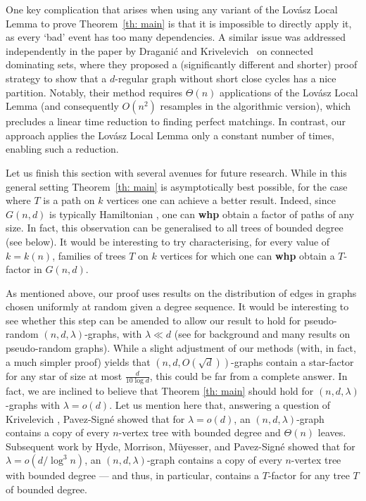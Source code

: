 \documentclass[notitlepage]{scrartcl}
\begin{document}
One key complication that arises when using any variant of the Lov\'asz Local Lemma to prove Theorem~\ref{th: main} is that it is impossible to directly apply it, as every `bad' event has too many dependencies. A similar issue was addressed independently in the paper by Dragani\'c and Krivelevich~\cite{DK} on connected dominating sets, where they proposed a (significantly different and shorter) proof strategy to show that a $d$-regular graph without short close cycles has a nice partition. Notably, their method requires $\Theta(n)$ applications of the Lov\'asz Local Lemma (and consequently $O(n^2)$ resamples in the algorithmic version), which precludes a linear time reduction to finding perfect matchings. In contrast, our approach applies the Lov\'asz Local Lemma only a constant number of times, enabling such a reduction.











Let us finish this section with several avenues for future research. While in this general setting Theorem~\ref{th: main} is asymptotically best possible, for the case where $T$ is a path on $k$ vertices one can achieve a better result. Indeed, since $G(n,d)$ is typically Hamiltonian \cite{robinson1994almost}, one can \textbf{whp} obtain a factor of paths of any size. In fact, this observation can be generalised to all trees of bounded degree (see below). It would be interesting to try characterising, for every value of $k=k(n)$, families of trees $T$ on $k$ vertices for which one can \textbf{whp} obtain a $T$-factor in $G(n,d)$. 

As mentioned above, our proof uses results \cite{McKaySurvey, gao2023subgraph} on the distribution of edges in graphs chosen uniformly at random given a degree sequence. It would be interesting to see whether this step can be amended to allow our result to hold for pseudo-random $(n,d,\lambda)$-graphs, with $\lambda\ll d$ (see \cite{KS06} for background and many results on pseudo-random graphs). While a slight adjustment of our methods (with, in fact, a much simpler proof) yields that $\left(n,d,O(\sqrt{d})\right)$-graphs contain a star-factor for any star of size at most $\frac{d}{10\log d}$, this could be far from a complete answer. In fact, we are inclined to believe that Theorem \ref{th: main} should hold for $(n,d,\lambda)$-graphs with $\lambda=o(d)$. Let us mention here that, answering a question of Krivelevich \cite{K23}, Pavez-Sign\'e \cite{p23} showed that for $\lambda=o(d)$, an $(n,d,\lambda)$-graph contains a copy of every $n$-vertex tree with bounded degree and $\Theta(n)$ leaves. Subsequent work by Hyde, Morrison, M\"uyesser, and Pavez-Sign\'e \cite{HMMPM23} showed that for $\lambda=o(d/\log^3n)$, an $(n,d,\lambda)$-graph contains a copy of every $n$-vertex tree with bounded degree --- and thus, in particular, contains a $T$-factor for any tree $T$ of bounded degree. 
\end{document}

